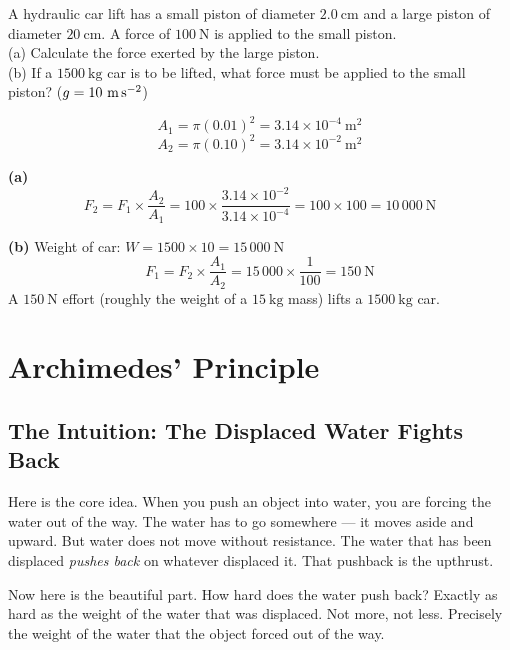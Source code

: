 \begin{examplebox}[11.4]
A hydraulic car lift has a small piston of diameter
$2.0\ \text{cm}$ and a large piston of diameter
$20\ \text{cm}$. A force of $100\ \text{N}$ is
applied to the small piston.\\
(a) Calculate the force exerted by the large piston.\\
(b) If a $1500\ \text{kg}$ car is to be lifted,
what force must be applied to the small piston?
($g = 10\ \text{m\,s}^{-2}$)
\end{examplebox}

\begin{solutionbox}
\[
  A_1 = \pi(0.01)^2 = 3.14\times10^{-4}\ \text{m}^2
\]
\[
  A_2 = \pi(0.10)^2 = 3.14\times10^{-2}\ \text{m}^2
\]

\textbf{(a)}
\[
  F_2 = F_1 \times \frac{A_2}{A_1}
  = 100 \times \frac{3.14\times10^{-2}}
  {3.14\times10^{-4}}
  = 100 \times 100 = 10\,000\ \text{N}
\]

\textbf{(b)} Weight of car: $W = 1500 \times 10
= 15\,000\ \text{N}$
\[
  F_1 = F_2 \times \frac{A_1}{A_2}
  = 15\,000 \times \frac{1}{100}
  = 150\ \text{N}
\]
A $150\ \text{N}$ effort (roughly the weight of
a $15\ \text{kg}$ mass) lifts a $1500\ \text{kg}$ car.
\end{solutionbox}

\section{Archimedes' Principle}

\subsection{The Intuition: The Displaced Water Fights Back}

Here is the core idea. When you push an object into
water, you are forcing the water out of the way.
The water has to go somewhere --- it moves aside
and upward. But water does not move without
resistance. The water that has been displaced
\textit{pushes back} on whatever displaced it.
That pushback is the upthrust.

Now here is the beautiful part. How hard does the
water push back? Exactly as hard as the weight of
the water that was displaced. Not more, not less.
Precisely the weight of the water that the object
forced out of the way.

